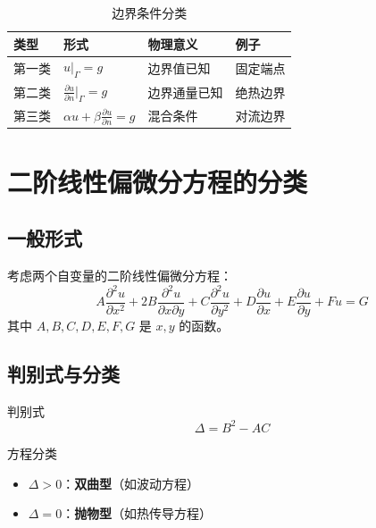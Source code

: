 \begin{table}[htbp]
\centering
\begin{tabular}{llll}
\toprule
\textbf{类型} & \textbf{形式} & \textbf{物理意义} & \textbf{例子} \\
\midrule
第一类 & $u|_{\Gamma} = g$ & 边界值已知 & 固定端点 \\
第二类 & $\frac{\partial u}{\partial n}|_{\Gamma} = g$ & 边界通量已知 & 绝热边界 \\
第三类 & $\alpha u + \beta\frac{\partial u}{\partial n} = g$ & 混合条件 & 对流边界 \\
\bottomrule
\end{tabular}
\caption{边界条件分类}
\label{tab:boundary-conditions}
\end{table}

\section{二阶线性偏微分方程的分类}

\subsection{一般形式}

考虑两个自变量的二阶线性偏微分方程：
\begin{equation}
    A\frac{\partial^2 u}{\partial x^2} + 2B\frac{\partial^2 u}{\partial x\partial y} + C\frac{\partial^2 u}{\partial y^2} + D\frac{\partial u}{\partial x} + E\frac{\partial u}{\partial y} + Fu = G
\end{equation}
其中 $A, B, C, D, E, F, G$ 是 $x, y$ 的函数。

\subsection{判别式与分类}

\begin{dingliyi}{判别式}{}
\begin{equation}
    \Delta = B^2 - AC
\end{equation}
\end{dingliyi}

\begin{dingli}{方程分类}{}
\begin{itemize}
    \item $\Delta > 0$：\textbf{双曲型}（如波动方程）
    \item $\Delta = 0$：\textbf{抛物型}（如热传导方程）
    \end{itemize}
\end{dingli}

